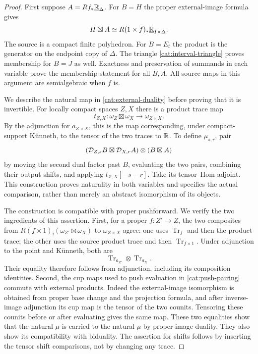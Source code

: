 \begin{proof}
First suppose $A=Rf_*\underline{\mathbb R}_{\Delta}$.  For $B=H$ the
proper external-image formula gives
\[
 H\boxtimes A
 \simeq R(1\times f)_*\underline{\mathbb R}_{I\times\Delta}.
\]
The source is a compact finite polyhedron.  For $B=E_t$ the product is
the generator on the endpoint copy of $\Delta$.  The triangle
\eqref{cat:interval-triangle} proves membership for $B=J$ as well.
Exactness and preservation of summands in each variable prove the
membership statement for all $B,A$.  All source maps in this argument
are semialgebraic when $f$ is.

We describe the natural map in \eqref{cat:external-duality} before
proving that it is invertible.  For locally compact spaces $Z,X$ there
is a product trace map
\begin{equation}
 \label{cat:product-trace}
 t_{Z,X}:\omega_Z\boxtimes\omega_X\longrightarrow\omega_{Z\times X}.
\end{equation}
By the adjunction for $a_{Z\times X}$, this is the map corresponding,
under compact-support K\"unneth, to the tensor of the two traces to
$\mathbb R$.  To define $\mu_{s,r}$, pair
\[
 (\mathcal D_{Z,s}B\boxtimes\mathcal D_{X,r}A)
       \otimes(B\boxtimes A)
\]
by moving the second dual factor past $B$, evaluating the two pairs,
combining their output shifts, and applying $t_{Z,X}[-s-r]$.
Take its tensor--Hom adjoint.  This construction proves naturality in
both variables and specifies the actual comparison, rather than merely
an abstract isomorphism of its objects.

The construction is compatible with proper pushforward.  We verify the
two ingredients of this assertion.  First, for a proper $f:Z'\to Z$,
the two composites from
$R(f\times1)_!(\omega_{Z'}\boxtimes\omega_X)$ to
$\omega_{Z\times X}$ agree: one uses $\operatorname{Tr}_f$ and then
the product trace; the other uses the source product trace and then
$\operatorname{Tr}_{f\times1}$.  Under adjunction to the point and
K\"unneth, both are
\[
 \operatorname{Tr}_{a_{Z'}}\otimes\operatorname{Tr}_{a_X}.
\]
Their equality therefore follows from adjunction, including its
composition identities.  Second, the cup maps used to push evaluation
in \eqref{cat:push-pairing} commute with external products.  Indeed
the external-image isomorphism is obtained from proper base change and
the projection formula, and after inverse-image adjunction its cup map
is the tensor of the two counits.  Tensoring these counits before or
after evaluating gives the same map.  These two equalities show that
the natural $\mu$ is carried to the natural $\mu$ by proper-image
duality.  They also show its compatibility with biduality.  The
assertion for shifts follows by inserting the tensor shift
comparisons, not by changing any trace.


\end{proof}
